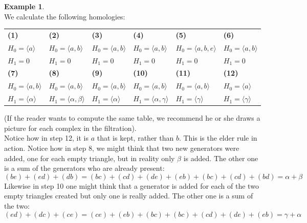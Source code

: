 \documentclass{article}
\theoremstyle{plain}
\theoremstyle{definition}
\newtheorem{example}{Example}[section]
\theoremstyle{remark}
\begin{document}
\begin{example}
\\
We calculate the following homologies:
\begin{center}
\begin{tabular}{|l|l|l|l|l|l|}
    \hline
     \textbf{(1)}&\textbf{(2)}&\textbf{(3)}&\textbf{(4)}&\textbf{(5)}&\textbf{(6)}  \\
     $ H_0=\langle a \rangle $ & 
     $ H_0=\langle a,b \rangle $ &
     $ H_0=\langle a,b \rangle $ &
     $ H_0=\langle a,b \rangle $ &
     $ H_0=\langle a,b,e \rangle $ &
     $ H_0=\langle a,b \rangle $ \\
     $H_1 = 0$ &
     $H_1 = 0$ &
     $H_1 = 0$ &
     $H_1 = 0$ &
     $H_1 = 0$ &
     $H_1 = 0$ \\
    \hline
     \textbf{(7)}&\textbf{(8)}&\textbf{(9)}&\textbf{(10)}&\textbf{(11)}&\textbf{(12)}\\
     $ H_0=\langle a,b \rangle $ &
     $ H_0=\langle a,b \rangle $ &
     $ H_0=\langle a,b \rangle $ &
     $ H_0=\langle a,b \rangle $ &
     $ H_0=\langle a,b \rangle $ &
     $ H_0=\langle a \rangle $ \\
     $H_1=\langle \alpha \rangle$ &
     $H_1=\langle \alpha,\beta  \rangle$ &
     $H_1=\langle \alpha \rangle$ &
     $H_1=\langle \alpha, \gamma \rangle$ &
     $H_1=\langle \gamma \rangle$ &
     $H_1=\langle \gamma \rangle$ \\
    \hline
\end{tabular}
\end{center}
(If the reader wants to compute the same table, we recommend he or she draws a picture for each complex in the filtration).\\
Notice how in step 12, it is $a$ that is kept, rather than $b$. This is the elder rule in action.
Notice how in step 8, we might think that two new generators were added, one for each empty triangle, but in reality only $\beta$ is added. The other one is a sum of the generators who are already present:
\[(be)+(ed)+(db)=(bc)+(cd)+(de)+(eb)+(bc)+(cd)+(bd)= \alpha + \beta  \]
Likewise in step 10 one might think that a generator is added for each of the two empty triangles created but only one is really added. The other one is a sum of the two:
\[ (ed)+(dc)+(ce) = (ce)+(eb)+(bc)+(bc)+(cd)+(de)+(eb) = \gamma + \alpha \]


\end{example}
\end{document}
